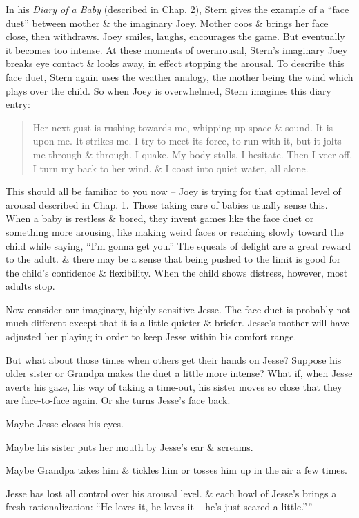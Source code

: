 \documentclass{article}
\numberwithin{equation}{section}
\begin{document}
In his \textit{Diary of a Baby} (described in Chap. 2), Stern gives the example of a ``face duet'' between mother \& the imaginary Joey. Mother coos \& brings her face close, then withdraws. Joey smiles, laughs, encourages the game. But eventually it becomes too intense. At these moments of overarousal, Stern's imaginary Joey breaks eye contact \& looks away, in effect stopping the arousal. To describe this face duet, Stern again uses the weather analogy, the mother being the wind which plays over the child. So when Joey is overwhelmed, Stern imagines this diary entry:
\begin{quotation}
	Her next gust is rushing towards me, whipping up space \& sound. It is upon me. It strikes me. I try to meet its force, to run with it, but it jolts me through \& through. I quake. My body stalls. I hesitate. Then I veer off. I turn my back to her wind. \& I coast into quiet water, all alone.
\end{quotation}
This should all be familiar to you now -- Joey is trying for that optimal level of arousal described in Chap. 1. Those taking care of babies usually sense this. When a baby is restless \& bored, they invent games like the face duet or something more arousing, like making weird faces or reaching slowly toward the child while saying, ``I'm gonna get you.'' The squeals of delight are a great reward to the adult. \& there may be a sense that being pushed to the limit is good for the child's confidence \& flexibility. When the child shows distress, however, most adults stop.

Now consider our imaginary, highly sensitive Jesse. The face duet is probably not much different except that it is a little quieter \& briefer. Jesse's mother will have adjusted her playing in order to keep Jesse within his comfort range.

But what about those times when others get their hands on Jesse? Suppose his older sister or Grandpa makes the duet a little more intense? What if, when Jesse averts his gaze, his way of taking a time-out, his sister moves so close that they are face-to-face again. Or she turns Jesse's face back.

Maybe Jesse closes his eyes.

Maybe his sister puts her mouth by Jesse's ear \& screams.

Maybe Grandpa takes him \& tickles him or tosses him up in the air a few times.

Jesse has lost all control over his arousal level. \& each howl of Jesse's brings a fresh rationalization: ``He loves it, he loves it -- he's just scared a little.'''' -- \cite[pp. 103--104]{Aron2013}
\end{document}

